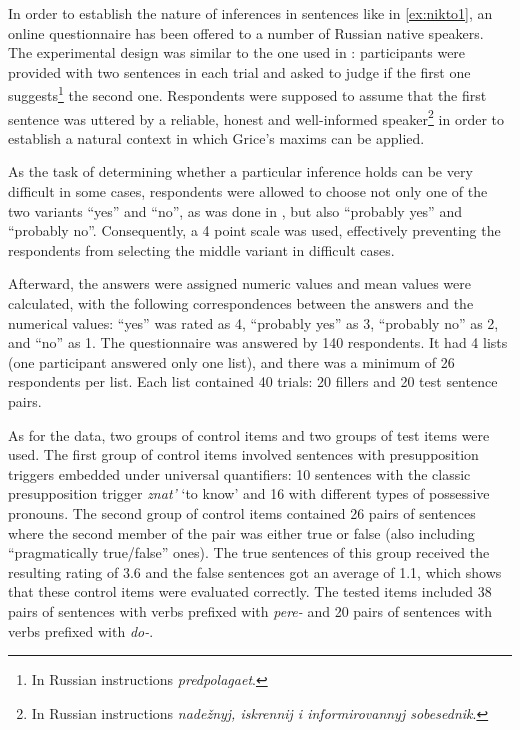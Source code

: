 In order to establish the nature of inferences in sentences like in \ref{ex:nikto1}, an online questionnaire has been offered to a number of Russian native speakers. The experimental design was similar to the one used in \citealt{Chemla:09}: participants were provided with two sentences in each trial and asked to judge if the first one suggests\footnote{In Russian instructions \textit{predpolagaet}.} the second one. Respondents were supposed to assume that the first sentence was uttered by a reliable, honest and well-informed speaker\footnote{In Russian instructions \textit{nade\v{z}nyj, iskrennij i informirovannyj sobesednik}.} in order to establish a natural context in which Grice's maxims can be applied.

As the task of determining whether a particular inference holds can be very difficult in some cases, respondents were allowed to choose not only one of the two variants ``yes'' and ``no'', as was done in \citealt{Chemla:09}, but also ``probably yes'' and ``probably no''. Consequently, a 4 point scale was used, effectively preventing the respondents from selecting the middle variant in difficult cases.

Afterward, the answers were assigned numeric values and mean values were calculated, with the following correspondences between the answers and the numerical values: ``yes'' was rated as 4, ``probably yes'' as 3, ``probably no'' as 2, and ``no'' as 1. The questionnaire was answered by 140 respondents. It had 4 lists (one participant answered only one list), and there was a minimum of 26 respondents per list. Each list contained 40 trials: 20 fillers and 20 test sentence pairs.

As for the data, two groups of control items and two groups of test items were used. The first group of control items involved sentences with presupposition triggers embedded under universal quantifiers: 10 sentences with the classic presupposition trigger \textit{znat'} `to know' and 16 with different types of possessive pronouns. The second group of control items contained 26 pairs of sentences where the second member of the pair was either true or false (also including ``pragmatically true/false'' ones). The true sentences of this group received the resulting rating of 3.6 and the false sentences got an average of 1.1, which shows that these control items were evaluated correctly. The tested items included 38 pairs of sentences with verbs prefixed with \textit{pere-} and 20 pairs of sentences with verbs prefixed with \textit{do-}.

